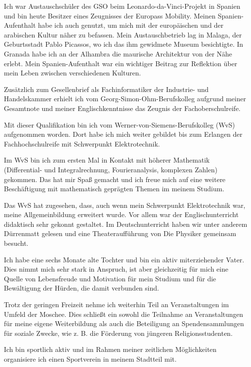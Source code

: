 \documentclass[a4paper]{article}
\begin{document}
Ich war Austauschschüler des GSO beim Leonardo-da-Vinci-Projekt in Spanien und bin heute Besitzer eines Zeugnisses der Europass Mobility. Meinen Spanien-Aufenthalt habe ich auch genutzt, um mich mit der europäischen und der arabischen Kultur näher zu befassen. Mein Austauschbetrieb lag in Malaga, der Geburtsstadt Pablo Picassos, wo ich das ihm gewidmete Museum besichtigte. In Granada habe ich an der Alhambra die maurische Architektur von der Nähe erlebt. Mein Spanien-Aufenthalt war ein wichtiger Beitrag zur Reflektion über mein Leben zwischen verschiedenen Kulturen.

Zusätzlich zum Gesellenbrief als Fachinformatiker der Industrie- und Handelskammer erhielt ich vom   Georg-Simon-Ohm-Berufskolleg aufgrund meiner Gesamtnote und meiner Englischkenntnisse das Zeugnis der Fachoberschulreife.

Mit dieser Qualifikation bin ich vom Werner-von-Siemens-Berufskolleg (WvS) aufgenommen worden. Dort habe ich mich weiter gebildet bis zum Erlangen der Fachhochschulreife mit Schwerpunkt Elektrotechnik.

Im WvS bin ich zum ersten Mal in Kontakt mit höherer Mathematik (Differential- und Integralrechnung, Fourieranalysis, komplexen Zahlen) gekommen. Das hat mir Spaß gemacht und ich freue mich auf eine weitere Beschäftigung mit mathematisch geprägten Themen im meinem Studium.

Das WvS hat zugesehen, dass, auch wenn mein Schwerpunkt Elektrotechnik war, meine Allgemeinbildung erweitert wurde. Vor allem war der Englischunterricht didaktisch sehr gekonnt gestaltet. Im Deutschunterricht haben wir unter anderem Dürrenmatt gelesen und eine Theateraufführung von \textquotedbl{}Die Physiker\textquotedbl{} gemeinsam besucht.

Ich habe eine sechs Monate alte Tochter und bin ein aktiv miterziehender Vater. Dies nimmt mich sehr stark in Anspruch, ist aber gleichzeitig für mich eine Quelle von Lebensfreude und Motivation für mein Studium und für die Bewältigung der Hürden, die damit verbunden sind.

Trotz der geringen Freizeit nehme ich weiterhin Teil an Veranstaltungen im Umfeld der Moschee. Dies schließt ein sowohl die Teilnahme an Veranstaltungen für meine eigene Weiterbildung als auch die Beteiligung an Spendensammlungen für soziale Zwecke, wie z. B. die Förderung von jüngeren Religionsstudenten.

Ich bin sportlich aktiv und im Rahmen meiner zeitlichen Möglichkeiten organisiere ich einen Sportverein in meinem Stadtteil mit.
\end{document}
